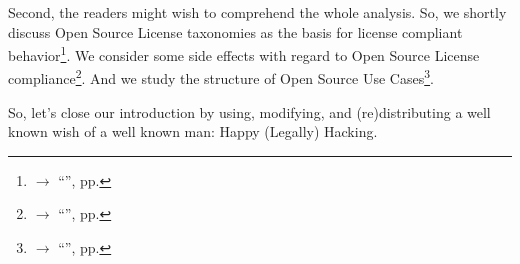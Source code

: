 Second, the readers might wish to comprehend the whole analysis. So, we
shortly discuss Open Source License taxonomies as the basis for license compliant
behavior\footnote{$\rightarrow$ \enquote{}, pp.
\pageref{sec:LicenseTaxonomies}}. We consider some side effects with
regard to Open Source License compliance\footnote{$\rightarrow$
\enquote{}, pp. \pageref{sec:SideEffects}}. And we
study the structure of Open Source Use Cases\footnote{$\rightarrow$
\enquote{}, pp. \pageref{sec:OSUCdeduction}}.

So, let's close our introduction by using, modifying, and (re)distributing a well
known wish of a well known man: Happy (Legally) Hacking.

%
